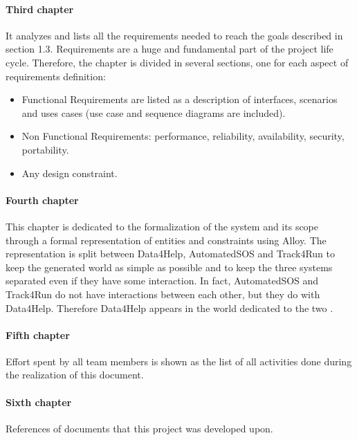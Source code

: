 \documentclass[../rasd.tex]{subfiles}
\begin{document}
		\paragraph{Third chapter}
		It analyzes and lists all the requirements needed to reach the goals described in section 1.3. Requirements are a huge and fundamental part of the project life cycle. Therefore, the chapter is divided in several sections, one for each aspect of requirements definition:
		\begin{itemize}
			\item Functional Requirements are listed as a description of interfaces, scenarios and uses cases (use case and sequence diagrams are included).
			\item Non Functional Requirements: performance, reliability, availability, security, portability.
			\item Any design constraint.
		\end{itemize}
		\paragraph{Fourth chapter}
		This chapter is dedicated to the formalization of the system and its scope through a formal representation of entities and constraints using Alloy. The representation is split between Data4Help, AutomatedSOS and Track4Run to keep the generated world as simple as possible and to keep the three systems separated even if they have some interaction. In fact, AutomatedSOS and Track4Run do not have interactions between each other, but they do with Data4Help. Therefore Data4Help appears in the world dedicated to the two .
		\paragraph{Fifth chapter}
		Effort spent by all team members is shown as the list of all activities done during the realization of this document.
		\paragraph{Sixth chapter}
		References of documents that this project was developed upon.
		
\end{document}
